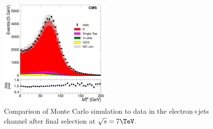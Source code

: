 \begin{figure}[hbtp]
     \includegraphics[width=0.48\textwidth]{Chapters/04_Analysis/04b_XSections/images/control_plots/before_fit/7TeV/EPlusJets_patType1CorrectedPFMet_MT_2orMoreBtags_with_ratio.pdf}\hfill
     \caption{Comparison of Monte Carlo simulation to data in the electron+jets channel after final
     selection at $\sqrt{s}=7\TeV$.}
     \label{fig:data_mc_comparison_7TeV_electron}
\end{figure}

